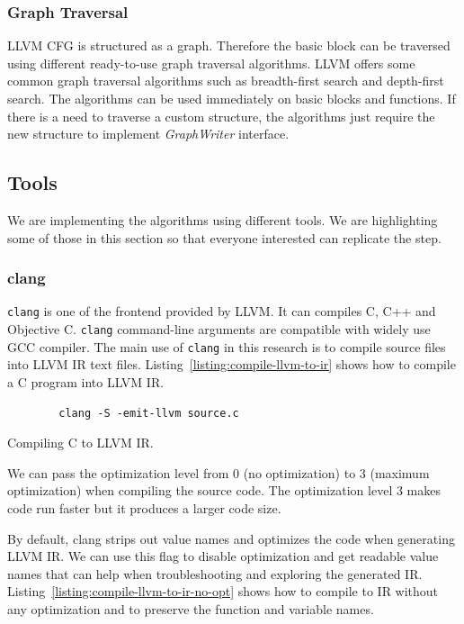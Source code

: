 \subsubsection{Graph Traversal}

LLVM CFG is structured as a graph. Therefore the basic block can be traversed
using different ready-to-use graph traversal algorithms. LLVM offers some common
graph traversal algorithms such as breadth-first search and depth-first search.
The algorithms can be used immediately on basic blocks and functions. If there
is a need to traverse a custom structure, the algorithms just require the new
structure to implement \emph{GraphWriter} interface.

\subsection{Tools}

We are implementing the algorithms using different tools. We are highlighting
some of those in this section so that everyone interested can replicate the
step.

\subsubsection{clang}

\texttt{clang} is one of the frontend provided by LLVM. It can compiles C, C++
and Objective C. \texttt{clang} command-line arguments are compatible with
widely use GCC compiler. The main use of \texttt{clang} in this research is to
compile source files into LLVM IR text files.
Listing~\ref{listing:compile-llvm-to-ir} shows how to compile a C program into
LLVM IR. 

\begin{listing}[htbp]
    \begin{verbatim}
        clang -S -emit-llvm source.c
    \end{verbatim}
    \caption{Compiling C to LLVM IR.}    
    \label{listing:compile-llvm-to-ir}
\end{listing}
    
We can pass the optimization level from 0 (no optimization) to 3 (maximum
optimization) when compiling the source code. The optimization level 3 makes
code run faster but it produces a larger code size.

By default, clang strips out value names and optimizes the code when generating
LLVM IR. We can use this flag to disable optimization and get readable value
names that can help when troubleshooting and exploring the generated IR.
Listing~\ref{listing:compile-llvm-to-ir-no-opt} shows how to compile to IR
without any optimization and to preserve the function and variable names.

